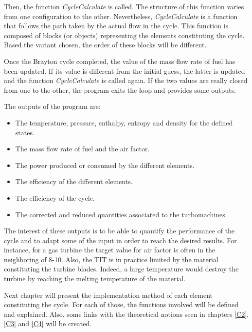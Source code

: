 Then, the function \textit{CycleCalculate} is called. The structure of this function varies from one configuration to the other. Nevertheless, \textit{CycleCalculate} is a function that follows the path taken by the actual flow in the cycle. This function is composed of blocks (or objects) representing the elements constituting the cycle. Based the variant chosen, the order of these blocks will be different.  

Once the Brayton cycle completed, the value of the mass flow rate of fuel has been updated. If its value is different from the initial guess, the latter is updated and the function \textit{CycleCalculate} is called again. If the two values are really closed from one to the other, the program exits the loop and provides some outputs.

The outputs of the program are:

\begin{itemize}
    \item The temperature, pressure, enthalpy, entropy and density for the defined states.
    \item The mass flow rate of fuel and the air factor.
    \item The power produced or consumed by the different elements.
    \item The efficiency of the different elements.
    \item The efficiency of the cycle.
    \item The corrected and reduced quantities associated to the turbomachines.
\end{itemize}

The interest of these outputs is to be able to quantify the performance of the cycle and to adapt some of the input in order to reach the desired results. For instance, for a gas turbine the target value for air factor is often in the neighboring of 8-10. Also, the TIT is in practice limited by the material constituting the turbine blades. Indeed, a large temperature would destroy the turbine by reaching the melting temperature of the material.

Next chapter will present the implementation method of each element constituting the cycle. For each of those, the functions involved will be defined and explained. Also, some links with the theoretical notions seen in chapters \ref{C2}, \ref{C3} and \ref{C4} will be created.






 